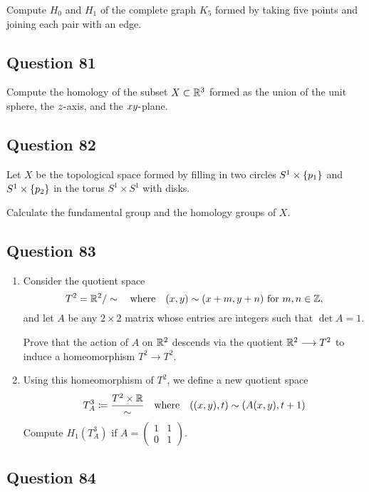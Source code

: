 \documentclass[12pt]{article}
\begin{document}
Compute \(H_0\) and \(H_1\) of the complete graph \(K_5\) formed by
taking five points and joining each pair with an edge.

\hypertarget{question-81-3}{%
\subsection{Question 81}\label{question-81-3}}

Compute the homology of the subset \(X \subset {\mathbb{R}}^3\) formed as the
union of the unit sphere, the \(z{\hbox{-}}\)axis, and the \(xy{\hbox{-}}\)plane.

\hypertarget{question-82-3}{%
\subsection{Question 82}\label{question-82-3}}

Let \(X\) be the topological space formed by filling in two circles
\(S^1 \times \left\{{p_1 }\right\}\) and \(S^1 \times \left\{{p_2 }\right\}\) in the
torus \(S^1 \times S^1\) with disks.

Calculate the fundamental group and the homology groups of \(X\).

\hypertarget{question-83-3}{%
\subsection{Question 83}\label{question-83-3}}

\begin{enumerate}
\def\labelenumi{\alph{enumi}.}
\item
  Consider the quotient space \[
  T^2 = {\mathbb{R}}^2 / \sim {\quad \operatorname{where} \quad} (x, y) \sim (x + m, y + n) \text{ for } m, n \in {\mathbb{Z}}
  ,\] and let \(A\) be any \(2 \times 2\) matrix whose entries are
  integers such that \(\det A = 1\).

  Prove that the action of \(A\) on \({\mathbb{R}}^2\) descends via the quotient
  \({\mathbb{R}}^2 \longrightarrow T^2\) to induce a homeomorphism \(T^2 \to T^2\).
\item
  Using this homeomorphism of \(T^2\), we define a new quotient space \[
  T_A^3 \coloneqq {T^2\times{\mathbb{R}}\over \sim} {\quad \operatorname{where} \quad} ((x, y), t) \sim (A(x, y), t + 1)
  \] Compute \(H_1 (T_A^3 )\) if
  \(A=\left(\begin{array}{ll} 1 & 1 \\ 0 & 1 \end{array}\right).\)
\end{enumerate}

\hypertarget{question-84-3}{%
\subsection{Question 84}\label{question-84-3}}
\end{document}
